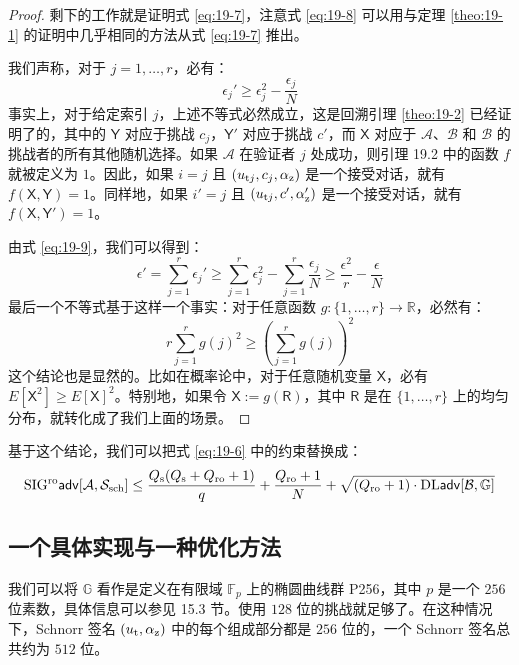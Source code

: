 \begin{proof}
剩下的工作就是证明式 \ref{eq:19-7}，注意式 \ref{eq:19-8} 可以用与定理 \ref{theo:19-1} 的证明中几乎相同的方法从式 \ref{eq:19-7} 推出。

我们声称，对于 $j=1,\dots,r$，必有：
\begin{equation}\label{eq:19-9}
\epsilon_j'\geq\epsilon_j^2-\frac{\epsilon_j}{N}
\end{equation}
事实上，对于给定索引 $j$，上述不等式必然成立，这是回溯引理 \ref{theo:19-2} 已经证明了的，其中的 $\mathsf{Y}$ 对应于挑战 $c_j$，$\mathsf{Y}'$ 对应于挑战 $c'$，而 $\mathsf{X}$ 对应于 $\mathcal{A}$、$\mathcal{B}$ 和 $\mathcal{B}$ 的挑战者的所有其他随机选择。如果 $\mathcal{A}$ 在验证者 $j$ 处成功，则引理 19.2 中的函数 $f$ 就被定义为 $1$。因此，如果 $i=j$ 且 $(u_{{\rm t}j},c_j,\alpha_{\rm z})$ 是一个接受对话，就有 $f(\mathsf{X},\mathsf{Y})=1$。同样地，如果 $i'=j$ 且 $(u_{{\rm t}j},c',\alpha_{\rm z}')$ 是一个接受对话，就有 $f(\mathsf{X},\mathsf{Y}')=1$。

由式 \ref{eq:19-9}，我们可以得到：
$$
\epsilon'
=\sum_{j=1}^r\epsilon_j'
\geq\sum_{j=1}^r\epsilon_j^2-\sum_{j=1}^r\frac{\epsilon_j}{N}
\geq\frac{\epsilon^2}{r}-\frac{\epsilon}{N}
$$
最后一个不等式基于这样一个事实：对于任意函数 $g:\{1,\dots,r\}\to\mathbb{R}$，必然有：
$$
r\sum_{j=1}^rg(j)^2\geq(\sum_{j=1}^rg(j))^2
$$
这个结论也是显然的。比如在概率论中，对于任意随机变量 $\mathsf{X}$，必有 $E[\mathsf{X}^2]\geq E[\mathsf{X}]^2$。特别地，如果令 $\mathsf{X}:=g(\mathsf{R})$，其中 $\mathsf{R}$ 是在 $\{1,\dots,r\}$ 上的均匀分布，就转化成了我们上面的场景。
\end{proof}

基于这个结论，我们可以把式 \ref{eq:19-6} 中的约束替换成：
\begin{equation}
{\rm SIG^{ro}\mathsf{adv}}[\mathcal{A},\mathcal{S}_{\rm sch}]\leq\frac{Q_{\rm s}(Q_{\rm s}+Q_{\rm ro}+1)}{q}+\frac{Q_{\rm ro}+1}{N}+\sqrt{(Q_{\rm ro}+1)\cdot{\rm DL\mathsf{adv}}[\mathcal{B},\mathbb{G}]}
\end{equation}


\subsection{一个具体实现与一种优化方法}\label{subsec:19-2-3}

我们可以将 $\mathbb{G}$ 看作是定义在有限域 $\mathbb{F}_p$ 上的椭圆曲线群 P256，其中 $p$ 是一个 $256$ 位素数，具体信息可以参见 15.3 节。使用 $128$ 位的挑战就足够了。在这种情况下，Schnorr 签名 $(u_{\rm t},\alpha_{\rm z})$ 中的每个组成部分都是 $256$ 位的，一个 Schnorr 签名总共约为 $512$ 位。

